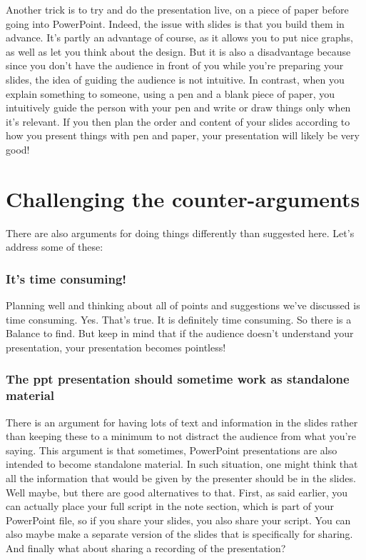 \documentclass[
  titlepage]{book}
\begin{document}
Another trick is to try and do the presentation live, on a piece of paper before going into PowerPoint. Indeed, the issue with slides is that you build them in advance. It's partly an advantage of course, as it allows you to put nice graphs, as well as let you think about the design. But it is also a disadvantage because since you don't have the audience in front of you while you're preparing your slides, the idea of guiding the audience is not intuitive. In contrast, when you explain something to someone, using a pen and a blank piece of paper, you intuitively guide the person with your pen and write or draw things only when it's relevant. If you then plan the order and content of your slides according to how you present things with pen and paper, your presentation will likely be very good!

\hypertarget{challenging-the-counter-arguments}{%
\section{Challenging the counter-arguments}\label{challenging-the-counter-arguments}}

There are also arguments for doing things differently than suggested here. Let's address some of these:

\hypertarget{its-time-consuming}{%
\subsubsection{It's time consuming!}\label{its-time-consuming}}

Planning well and thinking about all of points and suggestions we've discussed is time consuming. Yes. That's true. It is definitely time consuming. So there is a Balance to find. But keep in mind that if the audience doesn't understand your presentation, your presentation becomes pointless!

\hypertarget{the-ppt-presentation-should-sometime-work-as-standalone-material}{%
\subsubsection{The ppt presentation should sometime work as standalone material}\label{the-ppt-presentation-should-sometime-work-as-standalone-material}}

There is an argument for having lots of text and information in the slides rather than keeping these to a minimum to not distract the audience from what you're saying. This argument is that sometimes, PowerPoint presentations are also intended to become standalone material. In such situation, one might think that all the information that would be given by the presenter should be in the slides. Well maybe, but there are good alternatives to that. First, as said earlier, you can actually place your full script in the note section, which is part of your PowerPoint file, so if you share your slides, you also share your script. You can also maybe make a separate version of the slides that is specifically for sharing. And finally what about sharing a recording of the presentation?
\end{document}

